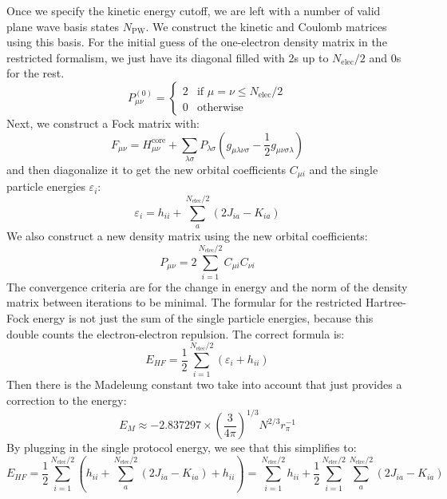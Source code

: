 \documentclass[12pt]{article}
\begin{document}
Once we specify the kinetic energy cutoff, we are left with a number of valid plane wave basis states $N_{\text{PW}}$. We construct the kinetic and Coulomb matrices using this basis. For the initial guess of the one-electron density matrix in the restricted formalism, we just have its diagonal filled with 2s up to $N_\text{elec}/2$ and 0s for the rest.
\begin{equation}
    P^{(0)}_{\mu\nu} = \begin{cases}
    2 & \text{if } \mu = \nu \leq N_\text{elec}/2 \\
    0 & \text{otherwise}
    \end{cases}
\end{equation}
Next, we construct a Fock matrix with:
\begin{equation}
    F_{\mu\nu} = H_{\mu\nu}^{\text{core}} + \sum_{\lambda\sigma} P_{\lambda\sigma} \left(g_{\mu\lambda\nu\sigma} - \frac{1}{2}g_{\mu\nu\sigma\lambda}\right)
\end{equation}
and then diagonalize it to get the new orbital coefficients $C_{\mu i}$ and the single particle energies $\varepsilon_i$:
\begin{equation}
    \varepsilon_i = h_{ii} + \sum_{a}^{N_\text{elec}/2} \left(2J_{ia} - K_{ia}\right)
\end{equation}
 We also construct a new density matrix using the new orbital coefficients:
\begin{equation}
    P_{\mu\nu} = 2\sum_{i=1}^{N_\text{elec}/2} C_{\mu i} C_{\nu i}
\end{equation}
 The convergence criteria are for the change in energy and the norm of the density matrix between iterations to be minimal.
The formular for the restricted Hartree-Fock energy is not just the sum of the single particle energies, because this double counts the electron-electron repulsion. The correct formula is:
\begin{equation}
    E_{HF} = \frac{1}{2} \sum_{i=1}^{N_\text{elec}/2} \left(\varepsilon_i + h_{ii}\right)
\end{equation}
Then there is the Madeleung constant two take into account that just provides a correction to the energy:
\begin{equation}
E_M \approx-2.837297 \times\left(\frac{3}{4 \pi}\right)^{1 / 3} N^{2 / 3} r_\pi^{-1}
\end{equation}
By plugging in the single protocol energy, we see that this simplifies to:
\begin{equation}
    E_{HF} = \frac{1}{2} \sum_{i=1}^{N_\text{elec}/2} \left(h_{ii} + \sum_{a}^{N_\text{elec}/2} \left(2J_{ia} - K_{ia}\right) + h_{ii}\right) = \sum_{i=1}^{N_\text{elec}/2} h_{ii} + \frac{1}{2} \sum_{i=1}^{N_\text{elec}/2} \sum_{a}^{N_\text{elec}/2} \left(2J_{ia} - K_{ia}\right)
\end{equation}
\end{document}
